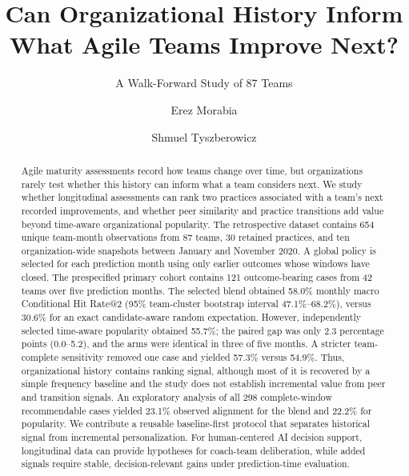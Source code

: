 \documentclass[runningheads]{llncs}
\begin{document}
\title{Can Organizational History Inform What Agile Teams Improve Next?}
\subtitle{A Walk-Forward Study of 87 Teams}

\author{Erez Morabia \and Shmuel Tyszberowicz}

\maketitle

\begin{abstract}
Agile maturity assessments record how teams change over time, but organizations rarely test whether this history can inform what a team considers next. We study whether longitudinal assessments can rank two practices associated with a team's next recorded improvements, and whether peer similarity and practice transitions add value beyond time-aware organizational popularity. The retrospective dataset contains 654 unique team-month observations from 87 teams, 30 retained practices, and ten organization-wide snapshots between January and November 2020. A global policy is selected for each prediction month using only earlier outcomes whose windows have closed. The prespecified primary cohort contains 121 outcome-bearing cases from 42 teams over five prediction months. The selected blend obtained 58.0\% monthly macro Conditional Hit Rate@2 (95\% team-cluster bootstrap interval 47.1\%--68.2\%), versus 30.6\% for an exact candidate-aware random expectation. However, independently selected time-aware popularity obtained 55.7\%; the paired gap was only 2.3 percentage points (0.0--5.2), and the arms were identical in three of five months. A stricter team-complete sensitivity removed one case and yielded 57.3\% versus 54.9\%. Thus, organizational history contains ranking signal, although most of it is recovered by a simple frequency baseline and the study does not establish incremental value from peer and transition signals. An exploratory analysis of all 298 complete-window recommendable cases yielded 23.1\% observed alignment for the blend and 22.2\% for popularity. We contribute a reusable baseline-first protocol that separates historical signal from incremental personalization. For human-centered AI decision support, longitudinal data can provide hypotheses for coach-team deliberation, while added signals require stable, decision-relevant gains under prediction-time evaluation.

\end{abstract}
\end{document}
